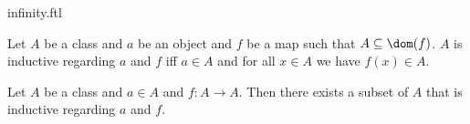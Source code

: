 \documentclass{naproche-library}
\begin{document}
\begin{smodule}[title=The Infinity Axiom]{infinity.ftl}

\begin{definition}[forthel,id=FOUNDATIONS_10_298374925738210]
  Let $A$ be a class and $a$ be an object and $f$ be a map such that $A \subseteq \dom(f)$.
  $A$ is inductive regarding $a$ and $f$ iff $a \in A$ and for all $x \in A$ we have $f(x) \in A$.
\end{definition}

\begin{axiom}[forthel,title=Infinity Axiom,id=FOUNDATIONS_10_367388832825344]
  Let $A$ be a class and $a \in A$ and $f : A \to A$.
  Then there exists a subset of $A$ that is inductive regarding $a$ and $f$.
\end{axiom}
\end{smodule}
\end{document}
